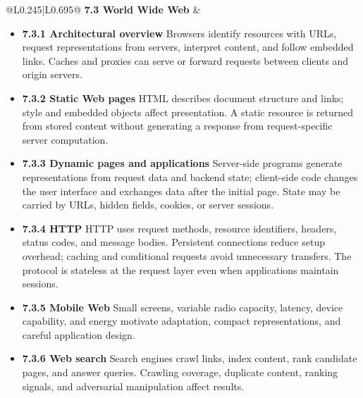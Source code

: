 \documentclass[10pt,letterpaper]{article}
\begin{document}
\begin{longtable}{@{}L{0.245\textwidth}|L{0.695\textwidth}@{}}
\textbf{7.3 World Wide Web} & \begin{minipage}[t]{\linewidth}\raggedright \begin{itemize}\item \textbf{7.3.1 Architectural overview} Browsers identify resources with URLs, request representations from servers, interpret content, and follow embedded links. Caches and proxies can serve or forward requests between clients and origin servers.\item \textbf{7.3.2 Static Web pages} HTML describes document structure and links; style and embedded objects affect presentation. A static resource is returned from stored content without generating a response from request-specific server computation.\item \textbf{7.3.3 Dynamic pages and applications} Server-side programs generate representations from request data and backend state; client-side code changes the user interface and exchanges data after the initial page. State may be carried by URLs, hidden fields, cookies, or server sessions.\item \textbf{7.3.4 HTTP} HTTP uses request methods, resource identifiers, headers, status codes, and message bodies. Persistent connections reduce setup overhead; caching and conditional requests avoid unnecessary transfers. The protocol is stateless at the request layer even when applications maintain sessions.\item \textbf{7.3.5 Mobile Web} Small screens, variable radio capacity, latency, device capability, and energy motivate adaptation, compact representations, and careful application design.\item \textbf{7.3.6 Web search} Search engines crawl links, index content, rank candidate pages, and answer queries. Crawling coverage, duplicate content, ranking signals, and adversarial manipulation affect results.\end{itemize}\end{minipage} \\ \hline

\end{longtable}
\end{document}
